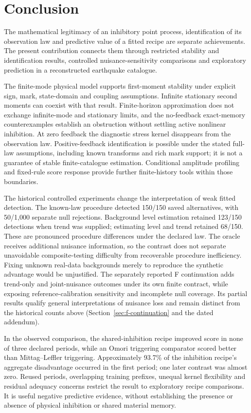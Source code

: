 \chapter{Conclusion}
\label{ch:conclusion}

The mathematical legitimacy of an inhibitory point process, identification of its observation law and predictive value of a fitted recipe are separate achievements. The present contribution connects them through restricted stability and identification results, controlled nuisance-sensitivity comparisons and exploratory prediction in a reconstructed earthquake catalogue.

The finite-mode physical model supports first-moment stability under explicit sign, mark, state-domain and coupling assumptions. Infinite stationary second moments can coexist with that result. Finite-horizon approximation does not exchange infinite-mode and stationary limits, and the no-feedback exact-memory counterexamples establish an obstruction without settling active nonlinear inhibition. At zero feedback the diagnostic stress kernel disappears from the observation law. Positive-feedback identification is possible under the stated full-law assumptions, including known transforms and rich mark support; it is not a guarantee of stable finite-catalogue estimation. Conditional amplitude profiling and fixed-rule score response provide further finite-history tools within those boundaries.

The historical controlled experiments change the interpretation of weak fitted detection. The known-law procedure detected 150/150 saved alternatives, with 50/1,000 separate null rejections. Background level estimation retained 123/150 detections when trend was supplied; estimating level and trend retained 68/150. These are pronounced procedure differences under the declared law. The oracle receives additional nuisance information, so the contrast does not separate unavoidable composite-testing difficulty from recoverable procedure inefficiency. Fixing unknown real-data backgrounds merely to reproduce the synthetic advantage would be unjustified. The separately reported F continuation adds trend-only and joint-nuisance outcomes under its own finite contract, while exposing reference-calibration sensitivity and incomplete null coverage. Its partial results qualify general interpretations of nuisance loss and remain distinct from the historical counts above (Section~\ref{sec:f-continuation} and the dated addendum).

In the observed comparison, the shared-inhibition recipe improved score in none of three declared periods, while an Omori triggering comparator scored better than Mittag--Leffler triggering. Approximately 93.7\% of the inhibition recipe's aggregate disadvantage occurred in the first period; one later contrast was almost zero. Reused periods, overlapping training prefixes, unequal kernel flexibility and residual adequacy concerns restrict the result to exploratory recipe comparisons. It is useful negative predictive evidence, without establishing the presence or absence of physical inhibition or shared material memory.

